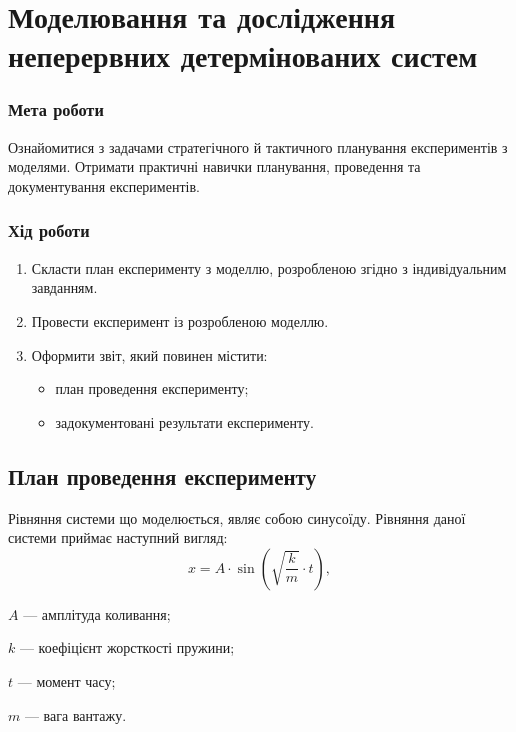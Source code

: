 


\newcommand{\labnumber}{6} %



\graphicspath{{figures/}}


\Ukrainian


\addtocounter{page}{1}

\section*{Моделювання та дослідження неперервних детермінованих систем}
\subsubsection*{Мета роботи}
Ознайомитися з задачами стратегічного й тактичного планування експериментів з моделями. 
Отримати практичні навички планування, проведення та документування експериментів. 
\subsubsection*{Хід роботи}
\begin{enumerate}
\item Скласти план експерименту з моделлю, розробленою згідно з індивідуальним завданням.
\item Провести експеримент із розробленою моделлю.
\item Оформити звіт, який повинен містити:
\begin{itemize}
\item план проведення експерименту;
\item задокументовані результати експерименту. 
\end{itemize}
\end{enumerate}

\subsection{План проведення експерименту}
Рівняння системи що моделюється, являє собою синусоїду. 
Рівняння даної системи приймає наступний вигляд:
\[
x = A \cdot \sin (\sqrt{\frac{k}{m}} \cdot t),
\]
\begin{description}
\item[де] $A$ --- амплітуда коливання;
\item $k$ --- коефіцієнт жорсткості пружини;
\item $t$ --- момент часу;
\item $m$ --- вага вантажу.
\end{description}

